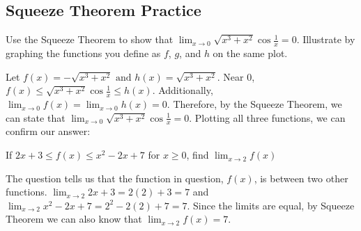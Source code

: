 \subsection{Squeeze Theorem Practice}

\begin{Exercise}
[title=Squeeze Theorem 1, label=squeeze1]
    Use the Squeeze Theorem to show that $\lim_{x \to 0}\sqrt{x^3 + x^2}
    \cos{\frac{1}{x}} = 0$. Illustrate by graphing the functions you define as 
    $f$, $g$, and $h$ on the same plot.
    \vspace{100mm}
\end{Exercise}
\begin{Answer}
    [ref=squeeze1]
    Let $f(x) = -\sqrt{x^3+x^2} \text{ and } h(x) = \sqrt{x^3+x^2}$. Near $0$, 
    $f(x) \leq \sqrt{x^3 + x^2}\cos{\frac{1}{x}} \leq h(x)$. Additionally, 
    $\lim_{x \to 0}f(x) = \lim_{x \to 0}h(x) = 0$. Therefore, by the Squeeze 
    Theorem, we can state that $\lim_{x \to 0}\sqrt{x^3 + x^2}\cos{\frac{1}{x}} 
    = 0$. Plotting all three functions, we can confirm our answer:

\end{Answer}

\begin{Exercise}
    [title=Squeeze Theorem 2, label=squeeze2]
    If $2x+3 \leq f(x) \leq x^2-2x+7$ for $x \geq 0$, find $\lim_{x \to 2}f(x)$
    \vspace{40mm}
\end{Exercise}
\begin{Answer}
    [ref=squeeze2]
    The question tells us that the function in question, $f(x)$, is between 
    two other functions. $\lim_{x \to 2}2x+3 = 2(2)+3 = 7$ and $\lim_{x \to 2} 
    x^2 - 2x + 7 = 2^2 - 2(2) + 7 = 7$. Since the limits are equal, by Squeeze 
    Theorem we can also know that $\lim_{x \to 2}f(x) = 7$.
\end{Answer}

